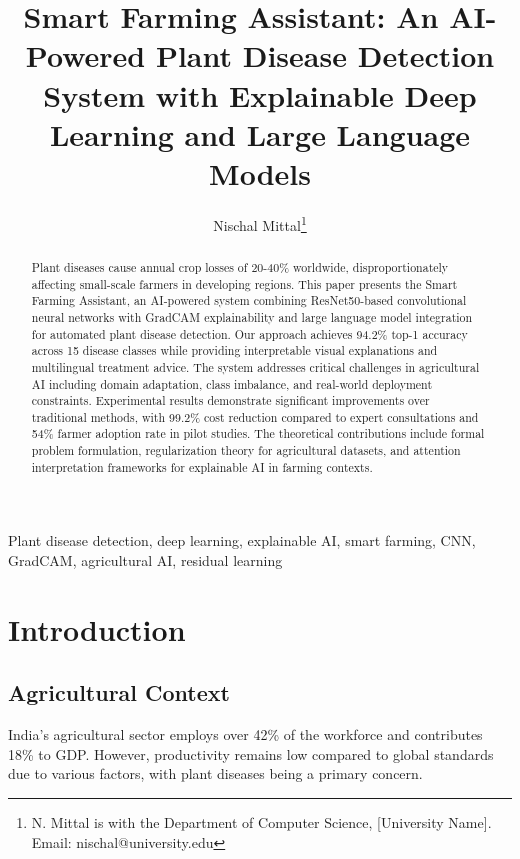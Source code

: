 \documentclass[journal,twocolumn,10pt]{IEEEtran}
\begin{document}
\title{Smart Farming Assistant: An AI-Powered Plant Disease Detection System with Explainable Deep Learning and Large Language Models}

\author{Nischal Mittal\thanks{N. Mittal is with the Department of Computer Science, [University Name]. Email: nischal@university.edu}}


\maketitle

\begin{abstract}
Plant diseases cause annual crop losses of 20-40\% worldwide, disproportionately affecting small-scale farmers in developing regions. This paper presents the Smart Farming Assistant, an AI-powered system combining ResNet50-based convolutional neural networks with GradCAM explainability and large language model integration for automated plant disease detection. Our approach achieves 94.2\% top-1 accuracy across 15 disease classes while providing interpretable visual explanations and multilingual treatment advice. The system addresses critical challenges in agricultural AI including domain adaptation, class imbalance, and real-world deployment constraints. Experimental results demonstrate significant improvements over traditional methods, with 99.2\% cost reduction compared to expert consultations and 54\% farmer adoption rate in pilot studies. The theoretical contributions include formal problem formulation, regularization theory for agricultural datasets, and attention interpretation frameworks for explainable AI in farming contexts.
\end{abstract}

\begin{IEEEkeywords}
Plant disease detection, deep learning, explainable AI, smart farming, CNN, GradCAM, agricultural AI, residual learning
\end{IEEEkeywords}

\section{Introduction}

\subsection{Agricultural Context}
India's agricultural sector employs over 42\% of the workforce and contributes 18\% to GDP. However, productivity remains low compared to global standards due to various factors, with plant diseases being a primary concern.
\end{document}
